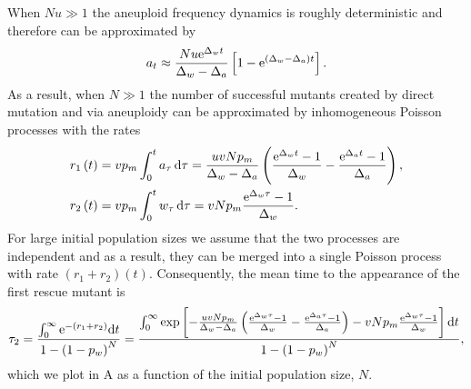 \documentclass[12pt]{extarticle}
\renewcommand{\d}[1]{\ensuremath{\operatorname{d}\!{#1}}}
\renewcommand{\d}{{\rm d}}
\newcommand{\e}{{\rm e}}
\begin{document}
When $Nu\gg1$ the aneuploid frequency dynamics is roughly deterministic and therefore can be approximated by 
\begin{equation}
a_t \approx \frac{Nu\e^{\Delta_wt}}{\Delta_w-\Delta_a}\left[1-\e^{\left(\Delta_w-\Delta_a\right)t}\right].
\end{equation}
As a result, when $N\gg1$ %
the number of successful mutants created by direct mutation and via aneuploidy can be approximated by inhomogeneous Poisson processes with the rates
\begin{align}
r_1\left(t\right)&=vp_m\int_0^ta_{\tau}\,\d\tau=\frac{uvNp_m}{\Delta_w-\Delta_a}\left(\frac{\e^{\Delta_wt}-1}{\Delta_w}-\frac{\e^{\Delta_at}-1}{\Delta_a}\right),\\
r_2\left(t\right)&=vp_m\int_0^tw_{\tau}\,\d\tau=vNp_m\frac{\e^{\Delta_w\tau}-1}{\Delta_w}.
\end{align}
For large initial population sizes we assume that the two processes are independent and as a result, they can be merged into a single Poisson process with rate $\left(r_1+r_2\right)\left(t\right)$.
Consequently, the mean time to the appearance of the first rescue mutant is
\begin{align}\label{meantimet2}
\tau_2 = 
\frac{\int_0^\infty\e^{-\left(r_1+r_2\right)} \d t}{1-\left(1-p_w\right)^N} = 
\frac{\int_0^\infty\exp\left[-\frac{uvNp_m}{\Delta_w-\Delta_a}\left(\frac{\e^{\Delta_w\tau}-1}{\Delta_w}-\frac{\e^{\Delta_a\tau}-1}{\Delta_a}\right)-vNp_m\frac{\e^{\Delta_w\tau}-1}{\Delta_w}\right] \d t}{1-\left(1-p_w\right)^N},
\end{align}
which we plot in A as a function of the initial population size, $N$.
\end{document}
